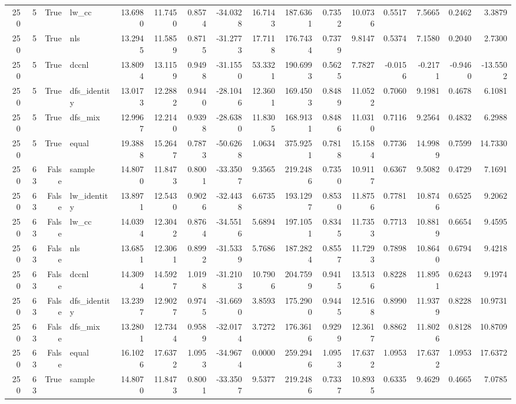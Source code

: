 \begin{tabular}{rrrlrrrrrrrrrrrr}
250 & 5 & True & lw_cc & 13.6980 & 11.7450 & 0.8574 & -34.0328 & 16.7143 & 187.6361 & 0.7352 & 10.0736 & 0.5517 & 7.5665 & 0.2462 & 3.3879 \\
250 & 5 & True & nls & 13.2945 & 11.5859 & 0.8715 & -31.2773 & 17.7118 & 176.7434 & 0.7379 & 9.8147 & 0.5374 & 7.1580 & 0.2040 & 2.7300 \\
250 & 5 & True & dccnl & 13.8094 & 13.1159 & 0.9498 & -31.1550 & 53.3321 & 190.6993 & 0.5625 & 7.7827 & -0.0156 & -0.2171 & -0.9460 & -13.5502 \\
250 & 5 & True & dfs_identity & 13.0173 & 12.2882 & 0.9440 & -28.1046 & 12.3601 & 169.4503 & 0.8489 & 11.0522 & 0.7060 & 9.1981 & 0.4678 & 6.1081 \\
250 & 5 & True & dfs_mix & 12.9967 & 12.2140 & 0.9398 & -28.6380 & 11.8305 & 168.9131 & 0.8486 & 11.0310 & 0.7116 & 9.2564 & 0.4832 & 6.2988 \\
250 & 5 & True & equal & 19.3888 & 15.2647 & 0.7873 & -50.6268 & 1.0634 & 375.9251 & 0.7818 & 15.1584 & 0.7736 & 14.9989 & 0.7599 & 14.7330 \\
250 & 63 & False & sample & 14.8070 & 11.8473 & 0.8001 & -33.3507 & 9.3565 & 219.2486 & 0.7350 & 10.9117 & 0.6367 & 9.5082 & 0.4729 & 7.1691 \\
250 & 63 & False & lw_identity & 13.8971 & 12.5430 & 0.9026 & -32.4438 & 6.6735 & 193.1297 & 0.8530 & 11.8756 & 0.7781 & 10.8746 & 0.6525 & 9.2062 \\
250 & 63 & False & lw_cc & 14.0394 & 12.3042 & 0.8764 & -34.5516 & 5.6894 & 197.1051 & 0.8345 & 11.7353 & 0.7713 & 10.8819 & 0.6654 & 9.4595 \\
250 & 63 & False & nls & 13.6851 & 12.3061 & 0.8992 & -31.5339 & 5.7686 & 187.2824 & 0.8557 & 11.7293 & 0.7898 & 10.8640 & 0.6794 & 9.4218 \\
250 & 63 & False & dccnl & 14.3094 & 14.5927 & 1.0198 & -31.2103 & 10.7906 & 204.7599 & 0.9415 & 13.5136 & 0.8228 & 11.8951 & 0.6243 & 9.1974 \\
250 & 63 & False & dfs_identity & 13.2397 & 12.9027 & 0.9745 & -31.6690 & 3.8593 & 175.2900 & 0.9445 & 12.5168 & 0.8990 & 11.9379 & 0.8228 & 10.9731 \\
250 & 63 & False & dfs_mix & 13.2801 & 12.7344 & 0.9589 & -32.0174 & 3.7272 & 176.3616 & 0.9299 & 12.3617 & 0.8862 & 11.8026 & 0.8128 & 10.8709 \\
250 & 63 & False & equal & 16.1026 & 17.6372 & 1.0953 & -34.9674 & 0.0000 & 259.2946 & 1.0953 & 17.6372 & 1.0953 & 17.6372 & 1.0953 & 17.6372 \\
250 & 63 & True & sample & 14.8070 & 11.8473 & 0.8001 & -33.3507 & 9.5377 & 219.2486 & 0.7337 & 10.8935 & 0.6335 & 9.4629 & 0.4665 & 7.0785 \\

\end{tabular}
